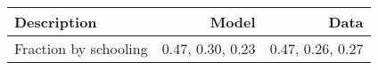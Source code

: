 \begin{tabular}{lrr}
\hline
Description & Model  & Data  \\
\hline
Fraction by schooling & 0.47, 0.30, 0.23  & 0.47, 0.26, 0.27  \\
\hline
\end{tabular}%
